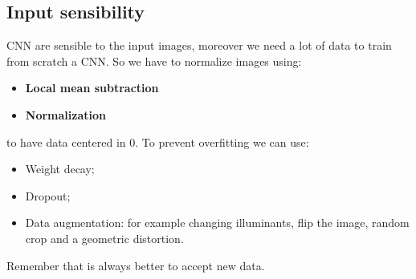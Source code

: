 \subsection{Input sensibility}
CNN are sensible to the input images, moreover we need a lot of data to train
from scratch a CNN. So we have to normalize images using:
\begin{itemize}
    \item \textbf{Local mean subtraction}
    \item \textbf{Normalization}
\end{itemize}
to have data centered in 0. To prevent overfitting we can use:
\begin{itemize}
    \item Weight decay;
    \item Dropout;
    \item Data augmentation: for example changing illuminants, flip the image,
          random crop and a geometric distortion.
\end{itemize}
Remember that is always better to accept new data.

